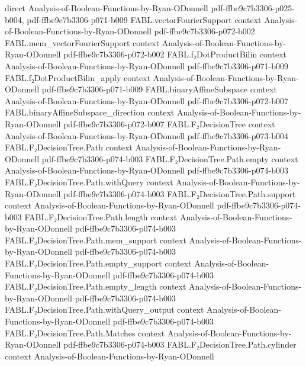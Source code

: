 \begin{theorem}
  {direct}
  {Analysis-of-Boolean-Functions-by-Ryan-ODonnell}
  {pdf-ffbe9c7b3306-p025-b004,
    pdf-ffbe9c7b3306-p071-b009}
\proofstep
  {FABL.vectorFourierSupport}
  {context}
  {Analysis-of-Boolean-Functions-by-Ryan-ODonnell}
  {pdf-ffbe9c7b3306-p072-b002}
\proofstep
  {FABL.mem_vectorFourierSupport}
  {context}
  {Analysis-of-Boolean-Functions-by-Ryan-ODonnell}
  {pdf-ffbe9c7b3306-p072-b002}
\proofstep
  {FABL.f₂DotProductBilin}
  {context}
  {Analysis-of-Boolean-Functions-by-Ryan-ODonnell}
  {pdf-ffbe9c7b3306-p071-b009}
\proofstep
  {FABL.f₂DotProductBilin_apply}
  {context}
  {Analysis-of-Boolean-Functions-by-Ryan-ODonnell}
  {pdf-ffbe9c7b3306-p071-b009}
\proofstep
  {FABL.binaryAffineSubspace}
  {context}
  {Analysis-of-Boolean-Functions-by-Ryan-ODonnell}
  {pdf-ffbe9c7b3306-p072-b007}
\proofstep
  {FABL.binaryAffineSubspace_direction}
  {context}
  {Analysis-of-Boolean-Functions-by-Ryan-ODonnell}
  {pdf-ffbe9c7b3306-p072-b007}
\proofstep
  {FABL.F₂DecisionTree}
  {context}
  {Analysis-of-Boolean-Functions-by-Ryan-ODonnell}
  {pdf-ffbe9c7b3306-p073-b004}
\proofstep
  {FABL.F₂DecisionTree.Path}
  {context}
  {Analysis-of-Boolean-Functions-by-Ryan-ODonnell}
  {pdf-ffbe9c7b3306-p074-b003}
\proofstep
  {FABL.F₂DecisionTree.Path.empty}
  {context}
  {Analysis-of-Boolean-Functions-by-Ryan-ODonnell}
  {pdf-ffbe9c7b3306-p074-b003}
\proofstep
  {FABL.F₂DecisionTree.Path.withQuery}
  {context}
  {Analysis-of-Boolean-Functions-by-Ryan-ODonnell}
  {pdf-ffbe9c7b3306-p074-b003}
\proofstep
  {FABL.F₂DecisionTree.Path.support}
  {context}
  {Analysis-of-Boolean-Functions-by-Ryan-ODonnell}
  {pdf-ffbe9c7b3306-p074-b003}
\proofstep
  {FABL.F₂DecisionTree.Path.length}
  {context}
  {Analysis-of-Boolean-Functions-by-Ryan-ODonnell}
  {pdf-ffbe9c7b3306-p074-b003}
\proofstep
  {FABL.F₂DecisionTree.Path.mem_support}
  {context}
  {Analysis-of-Boolean-Functions-by-Ryan-ODonnell}
  {pdf-ffbe9c7b3306-p074-b003}
\proofstep
  {FABL.F₂DecisionTree.Path.empty_support}
  {context}
  {Analysis-of-Boolean-Functions-by-Ryan-ODonnell}
  {pdf-ffbe9c7b3306-p074-b003}
\proofstep
  {FABL.F₂DecisionTree.Path.empty_length}
  {context}
  {Analysis-of-Boolean-Functions-by-Ryan-ODonnell}
  {pdf-ffbe9c7b3306-p074-b003}
\proofstep
  {FABL.F₂DecisionTree.Path.withQuery_output}
  {context}
  {Analysis-of-Boolean-Functions-by-Ryan-ODonnell}
  {pdf-ffbe9c7b3306-p074-b003}
\proofstep
  {FABL.F₂DecisionTree.Path.Matches}
  {context}
  {Analysis-of-Boolean-Functions-by-Ryan-ODonnell}
  {pdf-ffbe9c7b3306-p074-b003}
\proofstep
  {FABL.F₂DecisionTree.Path.cylinder}
  {context}
  {Analysis-of-Boolean-Functions-by-Ryan-ODonnell}

\end{theorem}
